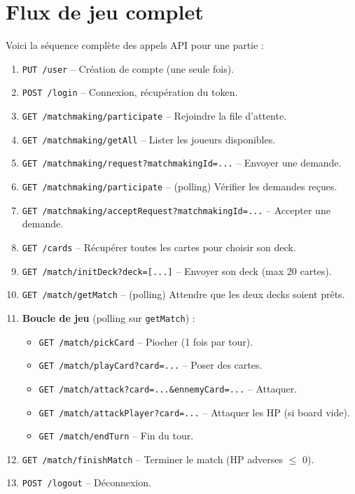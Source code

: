\documentclass[12pt,a4paper]{article}
\begin{document}
\section{Flux de jeu complet}

Voici la séquence complète des appels API pour une partie :

\begin{enumerate}
    \item \texttt{PUT /user} -- Création de compte (une seule fois).
    \item \texttt{POST /login} -- Connexion, récupération du token.
    \item \texttt{GET /matchmaking/participate} -- Rejoindre la file d'attente.
    \item \texttt{GET /matchmaking/getAll} -- Lister les joueurs disponibles.
    \item \texttt{GET /matchmaking/request?matchmakingId=...} -- Envoyer une demande.
    \item \texttt{GET /matchmaking/participate} -- (polling) Vérifier les demandes reçues.
    \item \texttt{GET /matchmaking/acceptRequest?matchmakingId=...} -- Accepter une demande.
    \item \texttt{GET /cards} -- Récupérer toutes les cartes pour choisir son deck.
    \item \texttt{GET /match/initDeck?deck=[...]} -- Envoyer son deck (max 20 cartes).
    \item \texttt{GET /match/getMatch} -- (polling) Attendre que les deux decks soient prêts.
    \item \textbf{Boucle de jeu} (polling sur \texttt{getMatch}) :
    \begin{itemize}[noitemsep]
        \item \texttt{GET /match/pickCard} -- Piocher (1 fois par tour).
        \item \texttt{GET /match/playCard?card=...} -- Poser des cartes.
        \item \texttt{GET /match/attack?card=...\&ennemyCard=...} -- Attaquer.
        \item \texttt{GET /match/attackPlayer?card=...} -- Attaquer les HP (si board vide).
        \item \texttt{GET /match/endTurn} -- Fin du tour.
    \end{itemize}
    \item \texttt{GET /match/finishMatch} -- Terminer le match (HP adverses $\leq$ 0).
    \item \texttt{POST /logout} -- Déconnexion.
\end{enumerate}
\end{document}
